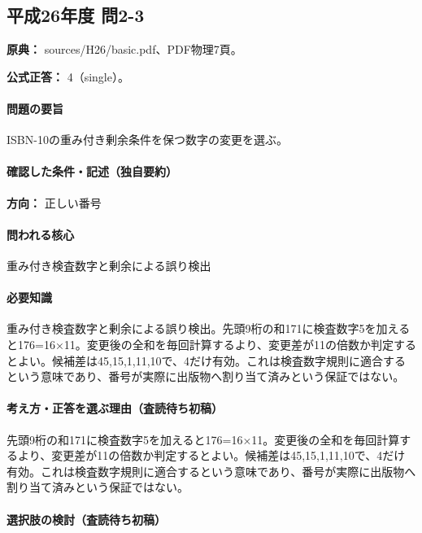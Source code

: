\subsection{平成26年度 問2-3}
\label{q:h26-reg-basic-2-3}

\noindent\textbf{原典：} sources/H26/basic.pdf、PDF物理7頁。

\textbf{公式正答：} 4（single）。

\paragraph{問題の要旨} ISBN-10の重み付き剰余条件を保つ数字の変更を選ぶ。

\paragraph{確認した条件・記述（独自要約）}\mbox{}\par

\noindent\textbf{方向：} 正しい番号\par

\paragraph{問われる核心} 重み付き検査数字と剰余による誤り検出

\paragraph{必要知識} 重み付き検査数字と剰余による誤り検出。先頭9桁の和171に検査数字5を加えると176=\allowbreak{}16×11。変更後の全和を毎回計算するより、変更差が11の倍数か判定するとよい。候補差は45,15,1,11,10で、4だけ有効。これは検査数字規則に適合するという意味であり、番号が実際に出版物へ割り当て済みという保証ではない。

\paragraph{考え方・正答を選ぶ理由（査読待ち初稿）} 先頭9桁の和171に検査数字5を加えると176=\allowbreak{}16×11。変更後の全和を毎回計算するより、変更差が11の倍数か判定するとよい。候補差は45,15,1,11,10で、4だけ有効。これは検査数字規則に適合するという意味であり、番号が実際に出版物へ割り当て済みという保証ではない。

\paragraph{選択肢の検討（査読待ち初稿）}\mbox{}\par

